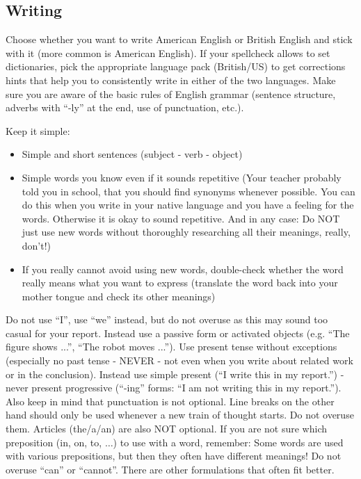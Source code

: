 \subsection{Writing}

Choose whether you want to write American English or British English and stick with it (more common is American English). If your spellcheck allows to set dictionaries, pick the appropriate language pack (British/US) to get corrections hints that help you to consistently write in either of the two languages.
Make sure you are aware of the basic rules of English grammar (sentence structure, adverbs with ``-ly'' at the end, use of punctuation, etc.).

Keep it simple: 

\begin{itemize}
	\item Simple and short sentences (subject - verb - object)
	\item Simple words you know even if it sounds repetitive (Your teacher probably told you in school, that you should find synonyms whenever possible. You can do this when you write in your native language and you have a feeling for the words. Otherwise it is okay to sound repetitive. And in any case: Do NOT just use new words without thoroughly researching all their meanings, really, don't!)
	\item If you really cannot avoid using new words, double-check whether the word really means what you want to express (translate the word back into your mother tongue and check its other meanings)
\end{itemize}

Do not use ``I'', use ``we'' instead, but do not overuse as this may sound too casual for your report. Instead use a passive form or activated objects (e.g. ``The figure shows ...'', ``The robot moves ...''). Use present tense without exceptions (especially no past tense - NEVER - not even when you write about related work or in the conclusion). Instead use simple present (``I write this in my report.'') - never present progressive (``-ing'' forms: ``I am not writing this in my report.''). Also keep in mind that punctuation is not optional. Line breaks on the other hand should only be used whenever a new train of thought starts. Do not overuse them. Articles (the/a/an) are also NOT optional. If you are not sure which preposition (in, on, to, $\ldots$) to use with a word, remember: Some words are used with various prepositions, but then they often have different meanings! Do not overuse ``can'' or ``cannot''. There are other formulations that often fit better.

